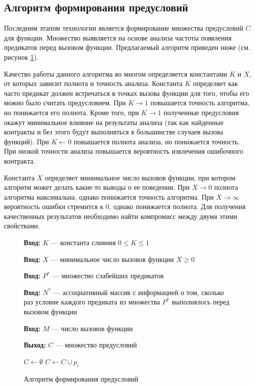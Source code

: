 \subsection{Алгоритм формирования предусловий}
Последним этапом технологии является формирование множества предусловий $C$ для функции. Множество выявляется на основе анализа частоты появления предикатов перед вызовом функции. Предлагаемый
алгоритм приведен ниже (см. рисунок \ref{image:extractionAlgoritm}).

Качество работы данного алгоритма во многом определяется константами $K$ и $X$, от которых зависит полнота и точность анализа. Константа $K$ определяет как часто предикат должен встречаться в точках вызова функции для того, чтобы его можно было считать предусловием. При $K \to 1$ повышается точность алгоритма, но понижается его полнота. Кроме того, при $K \to 1$ полученные предусловия окажут минимальное влияние на результаты анализа (так как найденные контракты и без этого будут выполняться в большинстве случаев вызова функций). При $K \leftarrow 0$ повышается полнота анализа, но понижается точность. При низкой точности анализа повышается вероятность извлечения ошибочного контракта. 

Константа $X$ определяет минимальное число вызовов функции, при котором алгоритм может делать какие-то выводы о ее поведении. При $X \to 0$ полнота алгоритма максимальна, однако  понижается точность алгоритма. При $X \to \infty$ вероятность ошибки стремится к 0, однако понижается полнота. Для получения качественных результатов необходимо найти компромисс между двумя этими свойствами.
\begin{figure}[h!]
\textbf{Вход:} $K$ --- константа слияния $0 \le K \le 1$

\textbf{Вход:} $X$ --- минимальное число вызовов функции $X \ge 0$

\textbf{Вход:} $P^*$ --- множество слабейших предикатов

\textbf{Вход:} $N^*$ --- ассоциативный массив с информацией о том, сколько раз условие каждого предиката из множества $P^*$ выполнялось перед вызовом функции

\textbf{Вход:} $M$ --- число вызовов функции

\textbf{Выход:} $C$ --- множество предусловий
\begin{algorithmic}[1]
\State $C \leftarrow \emptyset$
	\State \Return
\EndIf
{}
	\State $C \gets C \cup p_i$
    \EndIf
\EndFor
\end{algorithmic}
\caption{Алгоритм формирования предусловий}
\label{image:extractionAlgoritm}
\end{figure}

